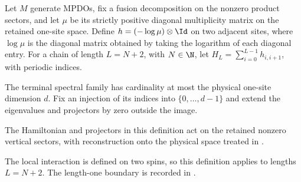 \begin{definition}%
    \label{def:mpdo_topological_gibbs_data_at_least_two}
    \leanok
    Let $M$ generate MPDOs, fix a fusion decomposition on the nonzero product
    sectors, and let $\mu$ be its strictly positive diagonal multiplicity
    matrix on the retained one-site space. Define
    $h=(-\log\mu)\otimes\Id$ on two adjacent sites, where $\log\mu$ is the
    diagonal matrix obtained by taking the logarithm of each diagonal entry.
    For a chain of length $L=N+2$, with $N\in\N$, let
    $H_L=\sum_{i=0}^{L-1}h_{i,i+1}$, with periodic indices.

    The terminal spectral family has cardinality at most the physical
    one-site dimension $d$. Fix an injection of its indices into
    $\{0,\ldots,d-1\}$ and extend the eigenvalues and projectors by zero
    outside the image.

    The Hamiltonian and projectors in this definition act on the retained
    nonzero vertical sectors, with reconstruction onto the physical space
    treated in \cite{gap:cpsv16_topological_gibbs_physical_complement}.

    The local interaction is defined on two spins, so this definition applies
    to lengths $L=N+2$. The length-one boundary is recorded in
    \cite{gap:cpsv16_topological_gibbs_length_one}.
\end{definition}

